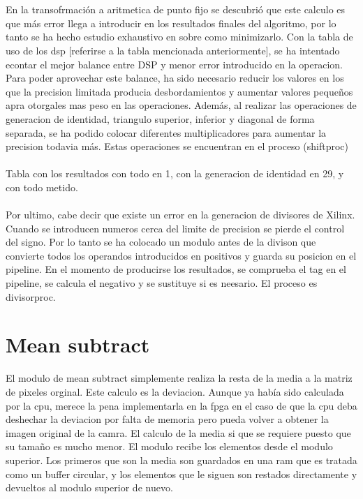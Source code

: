 \\
\\
En la transofrmación a aritmetica de punto fijo se descubrió que este calculo es que más error llega a introducir en los resultados finales del algoritmo, por lo tanto se ha hecho estudio exhaustivo en  sobre como minimizarlo. Con la tabla de uso de los dsp [referirse a la tabla mencionada anteriormente], se ha intentado econtar el mejor balance entre DSP y menor error introducido en la operacion.
Para poder aprovechar este balance, ha sido necesario reducir los valores en los que la precision limitada producia desbordamientos y aumentar valores pequeños apra otorgales mas peso en las operaciones. Además, al realizar las operaciones de generacion de identidad, triangulo superior, inferior y diagonal de forma separada, se ha podido colocar diferentes multiplicadores para aumentar la precision todavia más. Estas operaciones se encuentran en el proceso (shiftproc)
\\
\\
Tabla con los resultados con todo en 1, con la generacion de identidad en 29, y con todo metido. 
\\
\\
Por ultimo, cabe decir que existe un error en la generacion de divisores de Xilinx. Cuando se introducen numeros cerca del limite de precision se pierde el control del signo. Por lo tanto se ha colocado un modulo antes de la divison que convierte todos los operandos introducidos en positivos y guarda su posicion en el pipeline. En el momento de producirse los resultados, se comprueba el tag en el pipeline, se calcula el negativo y se sustituye si es neesario. El proceso es divisorproc.

\section{Mean subtract}
El modulo de mean subtract simplemente realiza la resta de la media a la matriz de pixeles orginal. Este calculo es la deviacion. Aunque ya había sido calculada por la cpu, merece la pena implementarla en la fpga en el caso de que la cpu deba deshechar la deviacion por falta de memoria pero pueda volver a obtener la imagen original de la camra. El calculo de la media si que se requiere puesto que su tamaño es mucho menor.
El modulo recibe los elementos desde el modulo superior. Los primeros que son la media son guardados en una ram que es tratada como un buffer circular, y los elementos que le siguen son restados directamente y devueltos al modulo superior de nuevo.


